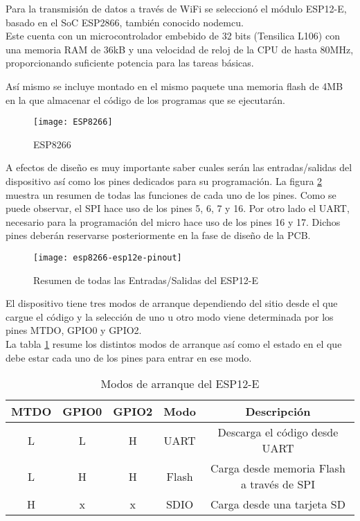 Para la transmisión de datos a través de WiFi se seleccionó el módulo ESP12-E, basado en el \acrshort{SoC} ESP2866, también conocido nodemcu.
\\Este cuenta con un microcontrolador embebido de 32 bits (Tensilica L106) con una memoria \acrshort{RAM} de 36kB y una velocidad de reloj de la \acrshort{CPU} de hasta 80MHz, proporcionando suficiente potencia para las tareas básicas.

Así mismo se incluye montado en el mismo paquete una memoria flash de 4MB en la que almacenar el código de los programas que se ejecutarán. 

\begin{figure} [h]
    \centering
    \texttt{[image: ESP8266]}
    \caption{ESP8266}
    \label{fig:ESP8266}
\end{figure}

A efectos de diseño es muy importante saber cuales serán las entradas/salidas del dispositivo así como los pines dedicados para su programación. La figura \ref{fig:ESP8266_pinout} muestra un resumen de todas las funciones de cada uno de los pines. Como se puede observar, el \acrshort{SPI} hace uso de los pines 5, 6, 7 y 16. Por otro lado el \acrshort{UART}, necesario para la programación del micro hace uso de los pines 16 y 17. Dichos pines deberán reservarse posteriormente en la fase de diseño de la \acrshort{PCB}.

\begin{figure} [h]
    \centering
    \texttt{[image: esp8266-esp12e-pinout]}
    \caption{Resumen de todas las Entradas/Salidas del ESP12-E}
    \label{fig:ESP8266_pinout}
\end{figure}

El dispositivo tiene tres modos de arranque dependiendo del sitio desde el que cargue el código y la selección de uno u otro modo viene determinada por los pines MTDO, GPIO0 y GPIO2. \\La tabla \ref{tab:ESP_Boot_Modes} resume los distintos modos de arranque así como el estado en el que debe estar cada uno de los pines para entrar en ese modo.
\begin{table} [h]
 	\centering
	\begin{tabular}{|c|c|c|c|c|}
		\hline 
		MTDO & GPIO0 & GPIO2 & Modo & Descripción \\ 
		\hline 
		L & L & H & UART & Descarga el código desde UART \\ 
		\hline 
		L & H & H & Flash & Carga desde memoria Flash a través de SPI \\ 
		\hline 
		H & x & x & SDIO & Carga desde una tarjeta SD \\ 
		\hline 
	\end{tabular} 
	\caption{Modos de arranque del ESP12-E}
    \label{tab:ESP_Boot_Modes}
\end{table}	

